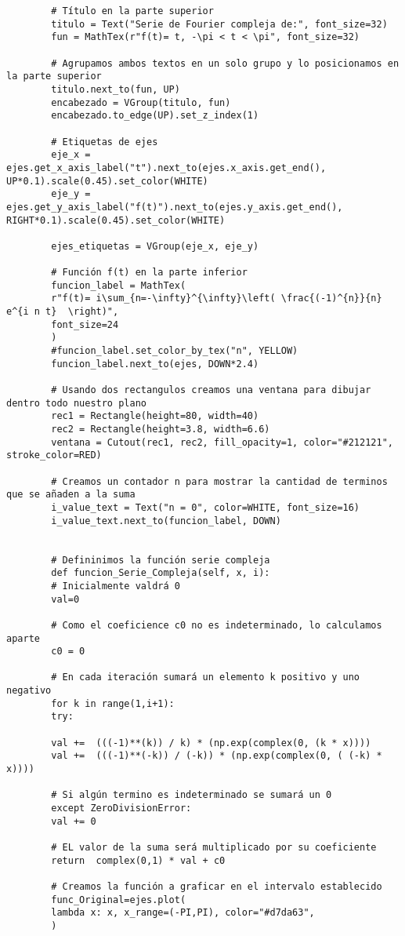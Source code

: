 \begin{longlisting}
\begin{verbatim}
		# Título en la parte superior
		titulo = Text("Serie de Fourier compleja de:", font_size=32)
		fun = MathTex(r"f(t)= t, -\pi < t < \pi", font_size=32)
		
		# Agrupamos ambos textos en un solo grupo y lo posicionamos en la parte superior
		titulo.next_to(fun, UP)
		encabezado = VGroup(titulo, fun)
		encabezado.to_edge(UP).set_z_index(1)
		
		# Etiquetas de ejes
		eje_x = ejes.get_x_axis_label("t").next_to(ejes.x_axis.get_end(), UP*0.1).scale(0.45).set_color(WHITE)
		eje_y = ejes.get_y_axis_label("f(t)").next_to(ejes.y_axis.get_end(), RIGHT*0.1).scale(0.45).set_color(WHITE)
		
		ejes_etiquetas = VGroup(eje_x, eje_y)
		
		# Función f(t) en la parte inferior
		funcion_label = MathTex(
		r"f(t)= i\sum_{n=-\infty}^{\infty}\left( \frac{(-1)^{n}}{n} e^{i n t}  \right)",
		font_size=24
		)
		#funcion_label.set_color_by_tex("n", YELLOW)
		funcion_label.next_to(ejes, DOWN*2.4)
		
		# Usando dos rectangulos creamos una ventana para dibujar dentro todo nuestro plano
		rec1 = Rectangle(height=80, width=40)
		rec2 = Rectangle(height=3.8, width=6.6)
		ventana = Cutout(rec1, rec2, fill_opacity=1, color="#212121", stroke_color=RED)
		
		# Creamos un contador n para mostrar la cantidad de terminos que se añaden a la suma
		i_value_text = Text("n = 0", color=WHITE, font_size=16)
		i_value_text.next_to(funcion_label, DOWN)
		
		
		# Defininimos la función serie compleja
		def funcion_Serie_Compleja(self, x, i):
		# Inicialmente valdrá 0 
		val=0
		
		# Como el coeficience c0 no es indeterminado, lo calculamos aparte
		c0 = 0
		
		# En cada iteración sumará un elemento k positivo y uno negativo
		for k in range(1,i+1):
		try:
		
		val +=  (((-1)**(k)) / k) * (np.exp(complex(0, (k * x))))
		val +=  (((-1)**(-k)) / (-k)) * (np.exp(complex(0, ( (-k) * x))))
		
		# Si algún termino es indeterminado se sumará un 0
		except ZeroDivisionError:
		val += 0 
		
		# EL valor de la suma será multiplicado por su coeficiente    
		return  complex(0,1) * val + c0
		
		# Creamos la función a graficar en el intervalo establecido
		func_Original=ejes.plot(
		lambda x: x, x_range=(-PI,PI), color="#d7da63",
		)
		

\end{verbatim}
\end{longlisting}
